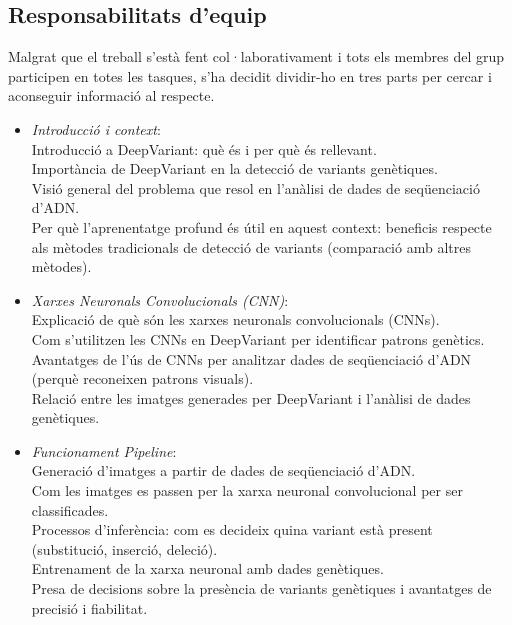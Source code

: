 \documentclass[a4paper]{article}
\begin{document}
	\subsection{Responsabilitats d'equip}
		Malgrat que el treball s'està fent col·laborativament i tots els membres del grup participen en totes les tasques, s'ha decidit dividir-ho en tres parts per cercar i aconseguir informació al respecte.
	\begin{itemize}
		\item \emph{Introducció i context}:\\
			Introducció a DeepVariant: què és i per què és rellevant.\\
			Importància de DeepVariant en la detecció de variants genètiques.\\
			Visió general del problema que resol en l'anàlisi de dades de seqüenciació d'ADN.\\
			Per què l'aprenentatge profund és útil en aquest context: beneficis respecte als mètodes tradicionals de detecció de variants (comparació amb altres mètodes).\\
			
		\item \emph{Xarxes Neuronals Convolucionals (CNN)}:\\
			Explicació de què són les xarxes neuronals convolucionals (CNNs).\\
			Com s'utilitzen les CNNs en DeepVariant per identificar patrons genètics.\\
			Avantatges de l'ús de CNNs per analitzar dades de seqüenciació d'ADN (perquè reconeixen patrons visuals).\\
			Relació entre les imatges generades per DeepVariant i l'anàlisi de dades genètiques.\\
			
		\item \emph{Funcionament Pipeline}:\\
			Generació d'imatges a partir de dades de seqüenciació d'ADN.\\
			Com les imatges es passen per la xarxa neuronal convolucional per ser classificades.\\
			Processos d'inferència: com es decideix quina variant està present (substitució, inserció, deleció).\\
			Entrenament de la xarxa neuronal amb dades genètiques.\\
			Presa de decisions sobre la presència de variants genètiques i avantatges de precisió i fiabilitat.\\
	\end{itemize}
	
\end{document}
